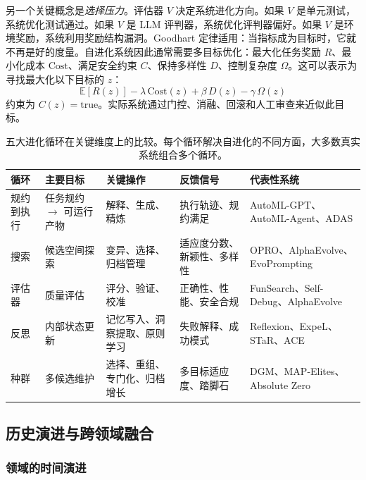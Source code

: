 另一个关键概念是\emph{选择压力}。评估器 $V$ 决定系统进化方向。如果 $V$ 是单元测试，系统优化测试通过。如果 $V$ 是 LLM 评判器，系统优化评判器偏好。如果 $V$ 是环境奖励，系统利用奖励结构漏洞。Goodhart 定律适用：当指标成为目标时，它就不再是好的度量。自进化系统因此通常需要多目标优化：最大化任务奖励 $R$、最小化成本 $\mathrm{Cost}$、满足安全约束 $C$、保持多样性 $D$、控制复杂度 $\Omega$。这可以表示为寻找最大化以下目标的 $z$：
\begin{equation}\label{eq:ch2-multi-obj}
\mathbb{E}[R(z)] - \lambda\,\mathrm{Cost}(z) + \beta\,D(z) - \gamma\,\Omega(z)
\end{equation}
约束为 $C(z) = \mathrm{true}$。实际系统通过门控、消融、回滚和人工审查来近似此目标。

\begin{table}[htbp]
\centering
\small
\caption{五大进化循环在关键维度上的比较。每个循环解决自进化的不同方面，大多数真实系统组合多个循环。}
\label{tab:ch2-five-loops}
\begin{tabular}{p{2.5cm}p{2.5cm}p{2.5cm}p{2.5cm}p{3.5cm}}
\toprule
\textbf{循环} & \textbf{主要目标} & \textbf{关键操作} & \textbf{反馈信号} & \textbf{代表性系统} \\
\midrule
规约到执行 & 任务规约 $\to$ 可运行产物 & 解释、生成、精炼 & 执行轨迹、规约满足 & AutoML-GPT、AutoML-Agent、ADAS \\
搜索 & 候选空间探索 & 变异、选择、归档管理 & 适应度分数、新颖性、多样性 & OPRO、AlphaEvolve、EvoPrompting \\
评估器 & 质量评估 & 评分、验证、校准 & 正确性、性能、安全合规 & FunSearch、Self-Debug、AlphaEvolve \\
反思 & 内部状态更新 & 记忆写入、洞察提取、原则学习 & 失败解释、成功模式 & Reflexion、ExpeL、STaR、ACE \\
种群 & 多候选维护 & 选择、重组、专门化、归档增长 & 多目标适应度、踏脚石 & DGM、MAP-Elites、Absolute Zero \\
\bottomrule
\end{tabular}
\end{table}

\subsection{历史演进与跨领域融合}\label{sec:ch2-history}

\subsubsection{领域的时间演进}

